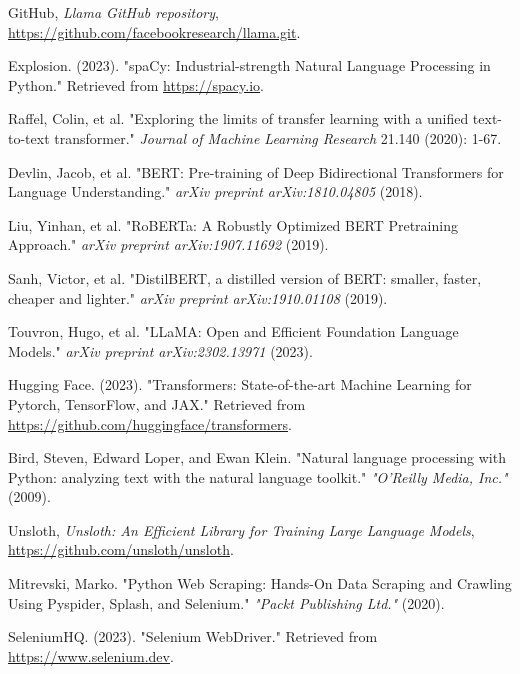 \documentclass[sigconf,authordraft]{acmart}
\begin{document}
\begin{thebibliography}{99}
        GitHub, \emph{Llama GitHub repository}, \href{https://github.com/facebookresearch/llama.git}{https://github.com/facebookresearch/llama.git}.

        Explosion. (2023). "spaCy: Industrial-strength Natural Language Processing in Python." Retrieved from \url{https://spacy.io}.

        Raffel, Colin, et al. "Exploring the limits of transfer learning with a unified text-to-text transformer." \emph{Journal of Machine Learning Research} 21.140 (2020): 1-67.

        Devlin, Jacob, et al. "BERT: Pre-training of Deep Bidirectional Transformers for Language Understanding." \emph{arXiv preprint arXiv:1810.04805} (2018).

        Liu, Yinhan, et al. "RoBERTa: A Robustly Optimized BERT Pretraining Approach." \emph{arXiv preprint arXiv:1907.11692} (2019).

        Sanh, Victor, et al. "DistilBERT, a distilled version of BERT: smaller, faster, cheaper and lighter." \emph{arXiv preprint arXiv:1910.01108} (2019).

        Touvron, Hugo, et al. "LLaMA: Open and Efficient Foundation Language Models." \emph{arXiv preprint arXiv:2302.13971} (2023).

        Hugging Face. (2023). "Transformers: State-of-the-art Machine Learning for Pytorch, TensorFlow, and JAX." Retrieved from \url{https://github.com/huggingface/transformers}.

        Bird, Steven, Edward Loper, and Ewan Klein. "Natural language processing with Python: analyzing text with the natural language toolkit." \emph{"O'Reilly Media, Inc."} (2009).

        Unsloth, \emph{Unsloth: An Efficient Library for Training Large Language Models}, \href{https://github.com/unsloth/unsloth}{https://github.com/unsloth/unsloth}.

        Mitrevski, Marko. "Python Web Scraping: Hands-On Data Scraping and Crawling Using Pyspider, Splash, and Selenium." \emph{"Packt Publishing Ltd."} (2020).

        SeleniumHQ. (2023). "Selenium WebDriver." Retrieved from \url{https://www.selenium.dev}.


\end{thebibliography}
\end{document}
